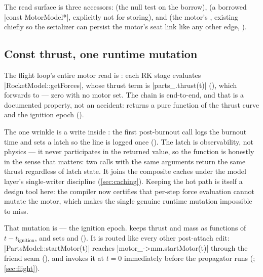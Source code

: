 The read surface is three accessors:  (the null test on the borrow),
 (a borrowed \cppinline|const MotorModel*|, explicitly not for storing), and
 (the motor's , existing chiefly so the serializer can persist
the motor's seat link like any other edge, ).

\subsection{Const thrust, one runtime mutation}\label{sec:motor-const}

The flight loop's entire motor read is : each RK stage evaluates
\cppinline|RocketModel::getForces|, whose thrust term is \cppinline|parts_.thrust(t)|
(), which forwards to  --- zero
with no motor set. The chain is  end-to-end, and that is a documented property, not an
accident:  returns a pure function of the thrust curve and the ignition epoch
().

The one wrinkle is a  write inside : the first post-burnout call
logs the burnout time and sets a latch so the line is logged once
(). The latch is observability, not physics --- it never
participates in the returned value, so the function is honestly  in the sense that
matters: two calls with the same arguments return the same thrust regardless of latch state. It
joins the composite caches under the model layer's single-writer  discipline
(\cref{sec:caching}). Keeping the hot path  is itself a design tool here: the
compiler now certifies that per-step force evaluation cannot mutate the motor, which makes the
single genuine runtime mutation impossible to miss.

That mutation is  --- the ignition epoch.  keeps thrust and
mass as functions of $t - t_{\mathrm{ignition}}$, and  sets
 and  (). It is routed
like every other post-attach edit: \cppinline|PartsModel::startMotor(t)| reaches
\cppinline|motor_->mm.startMotor(t)| through the friend seam
(), and  invokes it at $t=0$
immediately before the propagator runs (;
\cref{sec:flight}).

